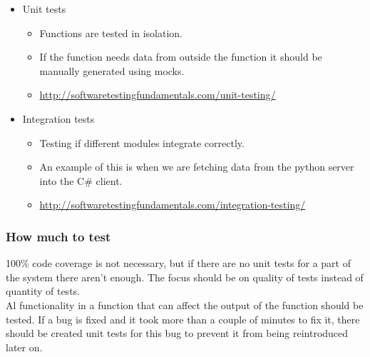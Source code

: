 \begin{itemize}
	\item Unit tests
		\begin{itemize}
			\item Functions are tested in isolation.
			\item If the function needs data from outside the function it should be manually generated using mocks.
			\item \url{http://softwaretestingfundamentals.com/unit-testing/}
		\end{itemize}
	\item Integration tests
		\begin{itemize}
			\item Testing if different modules integrate correctly.
			\item An example of this is when we are fetching data from the python server into the C\# client.
			\item \url{http://softwaretestingfundamentals.com/integration-testing/}
		\end{itemize}
\end{itemize}

\subsubsection{How much to test}
100\% code coverage is not necessary, but if there are no unit tests for a part of the system there aren’t enough. 
The focus should be on quality of tests instead of quantity of tests.
\\
Al functionality in a function that can affect the output of the function should be tested.
If a bug is fixed and it took more than a couple of minutes to fix it, there should be created unit tests for this bug to prevent it from being reintroduced later on.
